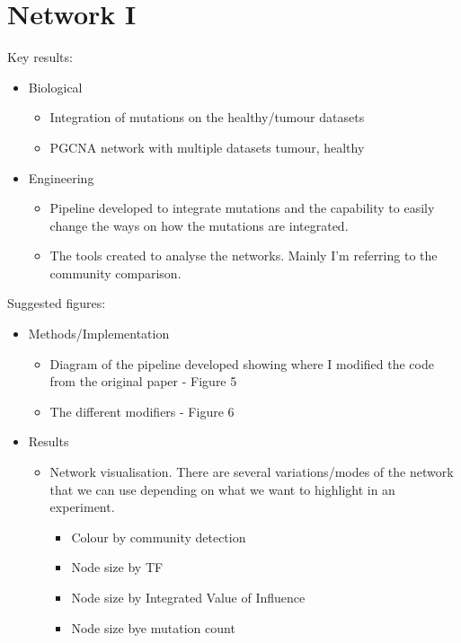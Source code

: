 \section{Network I}


Key results:
\begin{itemize}
    \item Biological
          \begin{itemize}
              \item Integration of mutations on the healthy/tumour datasets
              \item PGCNA network with multiple datasets tumour, healthy
          \end{itemize}
    \item Engineering
          \begin{itemize}
              \item Pipeline developed to integrate mutations and the capability to easily change the ways on how the mutations are integrated.
              \item The tools created to analyse the networks. Mainly I'm referring to the community comparison.
          \end{itemize}
\end{itemize}
Suggested figures:
\begin{itemize}
    \item Methods/Implementation
          \begin{itemize}
              \item Diagram of the pipeline developed showing where I modified the code from the original paper  - Figure 5
              \item The different modifiers - Figure 6
          \end{itemize}
    \item Results
          \begin{itemize}
              \item Network visualisation. There are several variations/modes of the network that we can use depending on what we want to highlight in an experiment.
                    \begin{itemize}
                        \item Colour by community detection
                        \item Node size by TF
                        \item Node size by Integrated Value of Influence
                        \item Node size bye mutation count
                    \end{itemize}

          \end{itemize}
\end{itemize}
